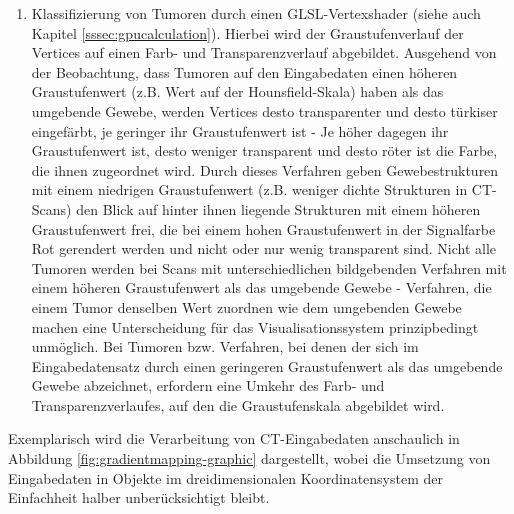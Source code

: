 \documentclass[pdftex,a4paper,titlepage,12pt]{scrartcl}
\newtheorem[L]{boxedDefinition}{Definition}
\begin{document}
\begin{enumerate}
 \item Klassifizierung von Tumoren durch einen GLSL-Vertexshader (siehe auch Kapitel \vref{sssec:gpucalculation}). Hierbei wird der Graustufenverlauf der Vertices auf einen Farb- und Transparenzverlauf abgebildet. Ausgehend von der Beobachtung, dass Tumoren auf den Eingabedaten einen höheren Graustufenwert (z.B. Wert auf der Hounsfield-Skala) haben als das umgebende Gewebe, werden Vertices desto transparenter und desto türkiser eingefärbt, je geringer ihr Graustufenwert ist - Je höher dagegen ihr Graustufenwert ist, desto weniger transparent und desto röter ist die Farbe, die ihnen zugeordnet wird. Durch dieses Verfahren geben Gewebestrukturen mit einem niedrigen Graustufenwert (z.B. weniger dichte Strukturen in CT-Scans) den Blick auf hinter ihnen liegende Strukturen mit einem höheren Graustufenwert frei, die bei einem hohen Graustufenwert in der Signalfarbe Rot gerendert werden und nicht oder nur wenig transparent sind. Nicht alle Tumoren werden bei Scans mit unterschiedlichen bildgebenden Verfahren mit einem höheren Graustufenwert als das umgebende Gewebe - Verfahren, die einem Tumor denselben Wert zuordnen wie dem umgebenden Gewebe machen eine Unterscheidung für das Visualisationssystem prinzipbedingt unmöglich. Bei Tumoren bzw. Verfahren, bei denen der sich im Eingabedatensatz durch einen geringeren Graustufenwert als das umgebende Gewebe abzeichnet, erfordern eine Umkehr des Farb- und Transparenzverlaufes, auf den die Graustufenskala abgebildet wird.
\end{enumerate}
Exemplarisch wird die Verarbeitung von CT-Eingabedaten anschaulich in Abbildung \vref{fig:gradientmapping-graphic} dargestellt, wobei die Umsetzung von Eingabedaten in Objekte im dreidimensionalen Koordinatensystem der Einfachheit halber unberücksichtigt bleibt.
\end{document}
